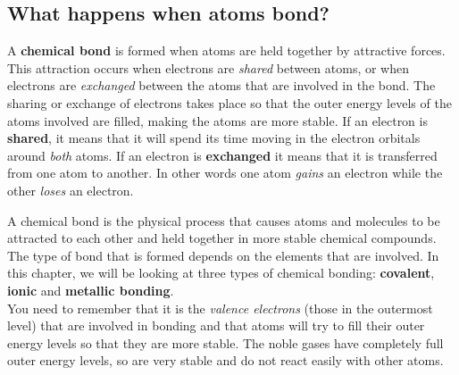             \subsection*{What happens when atoms bond?}
            \nopagebreak
      \label{m38704*id138842}A \textbf{chemical bond} is formed when atoms are held together by attractive forces. This attraction occurs when electrons are \textsl{shared} between atoms, or when electrons are \textsl{exchanged} between the atoms that are involved in the bond. The sharing or exchange of electrons takes place so that the outer energy levels of the atoms involved are filled, making the atoms are more stable. If an electron is \textbf{shared}, it means that it will spend its time moving in the electron orbitals around \textsl{both} atoms. If an electron is \textbf{exchanged} it means that it is transferred from one atom to another. In other words one atom \textsl{gains} an electron while the other \textsl{loses} an electron.\par 
\label{m38704*fhsst!!!underscore!!!id83}
 {A chemical bond is the physical process that causes atoms and molecules to be attracted to each other and held together in more stable chemical compounds.} 
      \label{m38704*id138909}The type of bond that is formed depends on the elements that are involved. In this chapter, we will be looking at three types of chemical bonding: \textbf{covalent}, \textbf{ionic} and \textbf{metallic bonding}.\\
      \label{m38704*id138929}You need to remember that it is the \textsl{valence electrons} (those in the outermost level) that are involved in bonding and that atoms will try to fill their outer energy levels so that they are more stable. The noble gases have completely full outer energy levels, so are very stable and do not react easily with other atoms.\\
